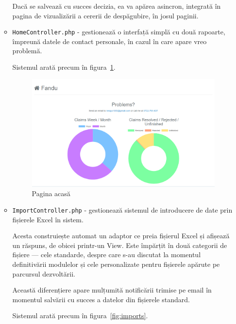 \begin{itemize}
\begin{itemize}
				Dacă se salvează cu succes decizia, ea va apărea asincron, integrată în pagina de vizualizării a cererii de despăgubire, în josul paginii.
				\item \verb|HomeController.php| - gestionează o interfață simplă cu două rapoarte, împreună datele de contact personale, în cazul în care apare vreo problemă.

				Sistemul arată precum în figura~\ref{fig:home_page}.

				\begin{figure}
					\includegraphics[width=\linewidth]{../imagini/home_page.png}
					\caption{Pagina acasă}
					\label{fig:home_page}
				\end{figure}

				\item \verb|ImportController.php| - gestionează sistemul de introducere de date prin fișierele Excel în sistem.

				Acesta construiește automat un adaptor ce preia fișierul Excel și afișează un răspuns, de obicei printr-un View.
				Este împărțit în două categorii de fișiere --- cele standarde, despre care s-au discutat la momentul definitivării modulelor și cele personalizate pentru fișierele apărute pe parcursul dezvoltării.

				Această diferențiere apare mulțumită notificării trimise pe email în momentul salvării cu succes a datelor din fișierele standard.

				Sistemul arată precum în figura~\ref{fig:imports}.


\end{itemize}
\end{itemize}
